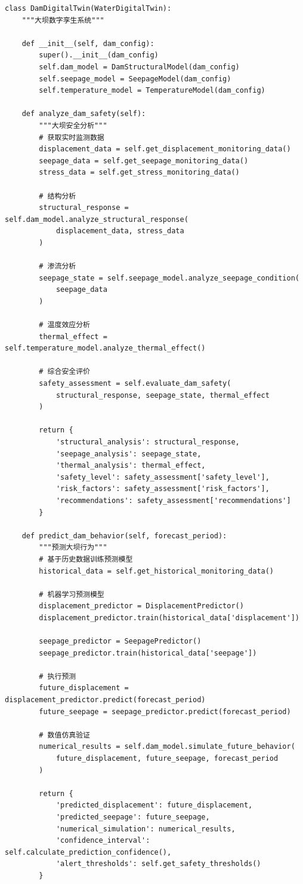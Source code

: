 \begin{lstlisting}[style=python]
class DamDigitalTwin(WaterDigitalTwin):
    """大坝数字孪生系统"""
    
    def __init__(self, dam_config):
        super().__init__(dam_config)
        self.dam_model = DamStructuralModel(dam_config)
        self.seepage_model = SeepageModel(dam_config)
        self.temperature_model = TemperatureModel(dam_config)
        
    def analyze_dam_safety(self):
        """大坝安全分析"""
        # 获取实时监测数据
        displacement_data = self.get_displacement_monitoring_data()
        seepage_data = self.get_seepage_monitoring_data()
        stress_data = self.get_stress_monitoring_data()
        
        # 结构分析
        structural_response = self.dam_model.analyze_structural_response(
            displacement_data, stress_data
        )
        
        # 渗流分析
        seepage_state = self.seepage_model.analyze_seepage_condition(
            seepage_data
        )
        
        # 温度效应分析
        thermal_effect = self.temperature_model.analyze_thermal_effect()
        
        # 综合安全评价
        safety_assessment = self.evaluate_dam_safety(
            structural_response, seepage_state, thermal_effect
        )
        
        return {
            'structural_analysis': structural_response,
            'seepage_analysis': seepage_state,
            'thermal_analysis': thermal_effect,
            'safety_level': safety_assessment['safety_level'],
            'risk_factors': safety_assessment['risk_factors'],
            'recommendations': safety_assessment['recommendations']
        }
        
    def predict_dam_behavior(self, forecast_period):
        """预测大坝行为"""
        # 基于历史数据训练预测模型
        historical_data = self.get_historical_monitoring_data()
        
        # 机器学习预测模型
        displacement_predictor = DisplacementPredictor()
        displacement_predictor.train(historical_data['displacement'])
        
        seepage_predictor = SeepagePredictor()
        seepage_predictor.train(historical_data['seepage'])
        
        # 执行预测
        future_displacement = displacement_predictor.predict(forecast_period)
        future_seepage = seepage_predictor.predict(forecast_period)
        
        # 数值仿真验证
        numerical_results = self.dam_model.simulate_future_behavior(
            future_displacement, future_seepage, forecast_period
        )
        
        return {
            'predicted_displacement': future_displacement,
            'predicted_seepage': future_seepage,
            'numerical_simulation': numerical_results,
            'confidence_interval': self.calculate_prediction_confidence(),
            'alert_thresholds': self.get_safety_thresholds()
        }
\end{lstlisting}

